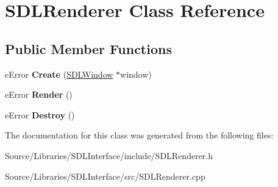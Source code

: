 \hypertarget{class_s_d_l_renderer}{\section{S\-D\-L\-Renderer Class Reference}
\label{class_s_d_l_renderer}
}
\subsection*{Public Member Functions}
\begin{DoxyCompactItemize}
\item 
\hypertarget{class_s_d_l_renderer_a4e285fad6b9bf9d6d146950cf7f134ce}{e\-Error {\bfseries Create} (\hyperlink{class_s_d_l_window}{S\-D\-L\-Window} $\ast$window)}\label{class_s_d_l_renderer_a4e285fad6b9bf9d6d146950cf7f134ce}

\item 
\hypertarget{class_s_d_l_renderer_af04b495115d2d82e261978b790cbde6e}{e\-Error {\bfseries Render} ()}\label{class_s_d_l_renderer_af04b495115d2d82e261978b790cbde6e}

\item 
\hypertarget{class_s_d_l_renderer_a6555de3413ba1f4ea19a86df9f9b63b4}{e\-Error {\bfseries Destroy} ()}\label{class_s_d_l_renderer_a6555de3413ba1f4ea19a86df9f9b63b4}

\end{DoxyCompactItemize}


The documentation for this class was generated from the following files\-:\begin{DoxyCompactItemize}
\item 
Source/\-Libraries/\-S\-D\-L\-Interface/include/S\-D\-L\-Renderer.\-h\item 
Source/\-Libraries/\-S\-D\-L\-Interface/src/S\-D\-L\-Renderer.\-cpp\end{DoxyCompactItemize}
